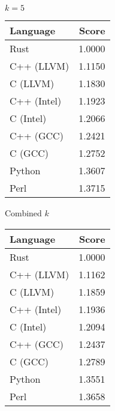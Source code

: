 \begin{subtable}{0.33\textwidth}
    \centering
    \caption{$k=5$}
    \label{table:energy:dfa_gap(5)}
    \begin{tabular}{|l|r|}
        \hline
        Language & Score \\
        \hline
        Rust & 1.0000 \\
        C++ (LLVM) & 1.1150 \\
        C (LLVM) & 1.1830 \\
        C++ (Intel) & 1.1923 \\
        C (Intel) & 1.2066 \\
        C++ (GCC) & 1.2421 \\
        C (GCC) & 1.2752 \\
        Python & 1.3607 \\
        Perl & 1.3715 \\
        \hline
    \end{tabular}
\end{subtable}%
\begin{subtable}{0.33\textwidth}
    \centering
    \caption{Combined $k$}
    \label{table:energy:dfa_gap:combined}
    \begin{tabular}{|l|r|}
        \hline
        Language & Score \\
        \hline
        Rust & 1.0000 \\
        C++ (LLVM) & 1.1162 \\
        C (LLVM) & 1.1859 \\
        C++ (Intel) & 1.1936 \\
        C (Intel) & 1.2094 \\
        C++ (GCC) & 1.2437 \\
        C (GCC) & 1.2789 \\
        Python & 1.3551 \\
        Perl & 1.3658 \\
        \hline
    \end{tabular}
\end{subtable}